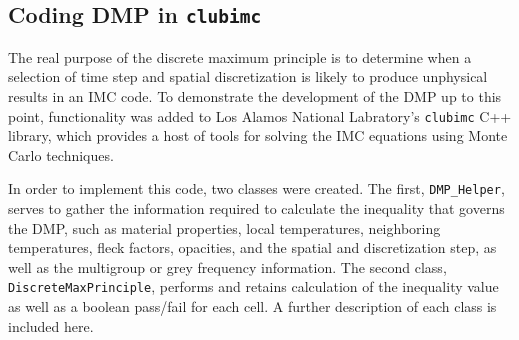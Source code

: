 \subsection{Coding DMP in \texttt{clubimc}}
The real purpose of the discrete maximum principle is to determine when a
selection of time step and spatial discretization is likely to produce
unphysical results in an IMC code.  To demonstrate the development of the DMP
up to this point, functionality was added to Los Alamos National
Labratory's \texttt{clubimc} C++ library, which provides a host of tools for
solving the IMC equations using Monte Carlo techniques.

In order to implement this code, two classes were created.  The first,
\texttt{DMP\_Helper}, serves to gather the information required to calculate the
inequality that governs the DMP, such as material properties, local
temperatures, neighboring temperatures, fleck factors, opacities, and the
spatial and discretization step, as well as the multigroup or grey frequency
information.  The second class, \texttt{DiscreteMaxPrinciple}, performs and
retains calculation of the inequality value as well as a boolean pass/fail for
each cell.  A further description of each class is included here.

